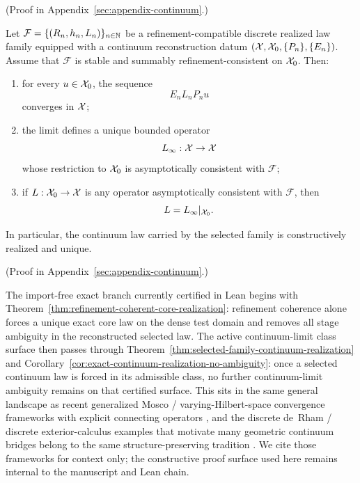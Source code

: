 (Proof in Appendix~\ref{sec:appendix-continuum}.)

\begin{theorem}
\label{thm:selected-family-continuum-realization}
Let $\mathcal F=\{(R_n,h_n,L_n)\}_{n\in\mathbb{N}}$ be a refinement-compatible
discrete realized law family equipped with a continuum reconstruction datum
$(\mathcal{X},\mathcal{X}_0,\{P_n\},\{E_n\})$. Assume that $\mathcal F$ is stable and
summably refinement-consistent on $\mathcal{X}_0$. Then:
\begin{enumerate}[label=(\roman*), leftmargin=2em, itemsep=0.2em]
\item for every $u\in\mathcal{X}_0$, the sequence
      \[
      E_nL_nP_nu
      \]
      converges in $\mathcal{X}$;
\item the limit defines a unique bounded operator
      \[
      L_\infty:\mathcal{X}\to\mathcal{X}
      \]
      whose restriction to $\mathcal{X}_0$ is asymptotically consistent with
      $\mathcal F$;
\item if $L:\mathcal{X}_0\to\mathcal{X}$ is any operator asymptotically consistent with
      $\mathcal F$, then
      \[
      L=L_\infty|_{\mathcal{X}_0}.
      \]
\end{enumerate}
In particular, the continuum law carried by the selected family is
constructively realized and unique.
\end{theorem}

(Proof in Appendix~\ref{sec:appendix-continuum}.)

\begin{remark}
\label{rem:varying-space-operator-convergence}
The import-free exact branch currently certified in Lean begins with
Theorem~\ref{thm:refinement-coherent-core-realization}: refinement coherence
alone forces a unique exact core law on the dense test domain and removes all
stage ambiguity in the reconstructed selected law. The active continuum-limit
class surface then passes through
Theorem~\ref{thm:selected-family-continuum-realization} and
Corollary~\ref{cor:exact-continuum-realization-no-ambiguity}: once a selected
continuum law is forced in its admissible class, no further continuum-limit
ambiguity remains on that certified surface. This sits in the same general
landscape as
recent generalized Mosco / varying-Hilbert-space convergence frameworks with
explicit connecting operators
\cite{GigaLasicaRybka2025}, and the discrete de~Rham / discrete
exterior-calculus examples that motivate many geometric continuum bridges
belong to the same structure-preserving tradition
\cite{ArnoldFalkWinther2006,ZhuChristiansenHuHirani2026}. We cite those
frameworks for context only; the constructive proof surface used here remains
internal to the manuscript and Lean chain.
\end{remark}

